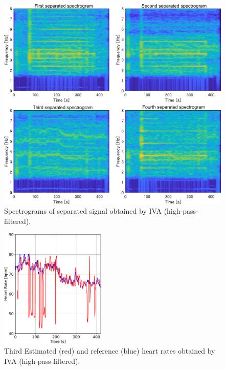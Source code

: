 \documentclass[10.5pt]{jarticle}
\begin{document}
\begin{figure}[tb]
\centering
\includegraphics[width=1.0\hsize]{spect_iva_filter_64_est.pdf}
\vspace{-20pt} %
\caption{Spectrograms of separated signal obtained by IVA (high-pass-filtered).}
\vspace{-15pt} %
\label{fig:sfiva64est}
\end{figure}

\begin{figure}[tb]
\centering
\vspace{5pt} %
\includegraphics[width=50mm]{hr_iva_filter_64_ch3.pdf}
\vspace{-10pt} %
\caption{Third Estimated (red) and reference (blue) heart rates obtained by IVA (high-pass-filtered).}
\vspace{-10pt} %
\label{fig:fhriva64ch3}
\end{figure}
\end{document}
